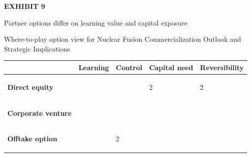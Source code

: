 \documentclass[10pt,a4paper]{article}
\begin{document}
\clearpage
{\textcolor{BOGreen}{\scriptsize\bfseries EXHIBIT 9}}\par\vspace{3pt}
{\sffamily\fontsize{15}{19}\selectfont\color{BONavy} Partner options differ on learning value and capital exposure}\par
{\small\color{BOText} Where-to-play option view for Nuclear Fusion Commercialization Outlook and Strategic Implications}\par\vspace{4pt}
{\scriptsize\begin{tabular}{p{38mm}>{\centering\arraybackslash}p{21mm}>{\centering\arraybackslash}p{21mm}>{\centering\arraybackslash}p{21mm}>{\centering\arraybackslash}p{21mm}}
 & {\bfseries Learning} & {\bfseries Control} & {\bfseries Capital need} & {\bfseries Reversibility} \\
\hline
{\bfseries Direct equity} & \colorbox{BOGreen}{\textcolor{white}{\strut\hspace{5pt}5\hspace{5pt}}} & \colorbox{BOGreen}{\textcolor{white}{\strut\hspace{5pt}4\hspace{5pt}}} & \colorbox{BOLight}{\textcolor{BOText}{\strut\hspace{5pt}2\hspace{5pt}}} & \colorbox{BOLight}{\textcolor{BOText}{\strut\hspace{5pt}2\hspace{5pt}}} \\
{\bfseries Corporate venture} & \colorbox{BOGreen}{\textcolor{white}{\strut\hspace{5pt}4\hspace{5pt}}} & \colorbox{BOBlue}{\textcolor{white}{\strut\hspace{5pt}3\hspace{5pt}}} & \colorbox{BOBlue}{\textcolor{white}{\strut\hspace{5pt}3\hspace{5pt}}} & \colorbox{BOBlue}{\textcolor{white}{\strut\hspace{5pt}3\hspace{5pt}}} \\
{\bfseries Offtake option} & \colorbox{BOBlue}{\textcolor{white}{\strut\hspace{5pt}3\hspace{5pt}}} & \colorbox{BOLight}{\textcolor{BOText}{\strut\hspace{5pt}2\hspace{5pt}}} & \colorbox{BOGreen}{\textcolor{white}{\strut\hspace{5pt}4\hspace{5pt}}} & \colorbox{BOGreen}{\textcolor{white}{\strut\hspace{5pt}4\hspace{5pt}}} \\

\end{tabular}}
\end{document}
